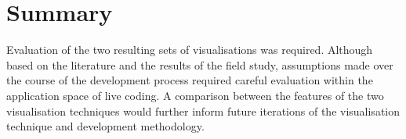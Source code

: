 \more


\section{Summary}

Evaluation of the two resulting sets of visualisations was required. Although based on the literature and the results of the field study, assumptions made over the course of the development process required careful evaluation within the application space of live coding. A comparison between the features of the two visualisation techniques would further inform future iterations of the visualisation technique and development methodology.